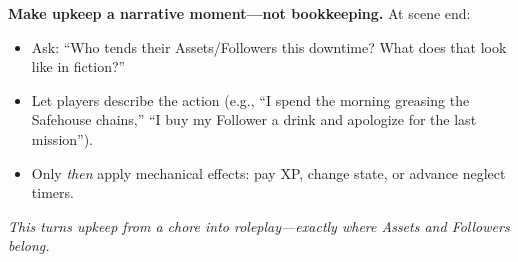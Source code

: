 \begin{tcolorbox}[colback=yellow!5!white,colframe=yellow!75!black,title={GM Tip: The Upkeep Reminder},breakable]
\textbf{Make upkeep a narrative moment---not bookkeeping.} At scene end:  
\begin{itemize}
  \item Ask: ``Who tends their Assets/Followers this downtime? What does that look like in fiction?''  
  \item Let players describe the action (e.g., ``I spend the morning greasing the Safehouse chains,'' ``I buy my Follower a drink and apologize for the last mission'').  
  \item Only \textit{then} apply mechanical effects: pay XP, change state, or advance neglect timers.  
\end{itemize}
\textit{This turns upkeep from a chore into roleplay---exactly where Assets and Followers belong.}
\end{tcolorbox}

